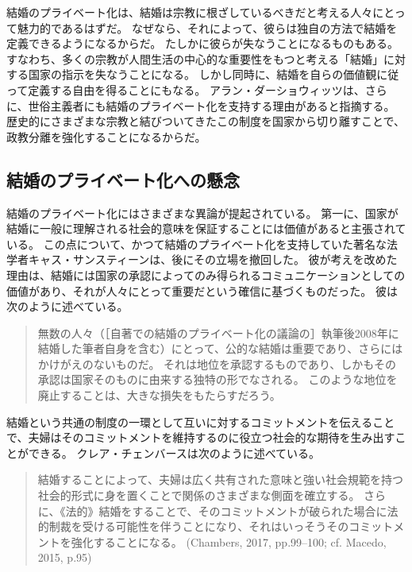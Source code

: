 \documentclass[paper=a4,book,openany]{jlreq}
\newcommand{\ig}[1]{}           %
\begin{document}
結婚のプライベート化は、結婚は宗教に根ざしているべきだと考える人々にとって魅力的であるはずだ。
なぜなら、それによって、彼らは独自の方法で結婚を定義できるようになるからだ。
たしかに彼らが失なうことになるものもある。
すなわち、多くの宗教が人間生活の中心的な重要性をもつと考える「結婚」に対する国家の指示を失なうことになる。
しかし同時に、結婚を自らの価値観に従って定義する自由を得ることにもなる。
アラン・ダーショウィッツは、さらに、世俗主義者にも結婚のプライベート化を支持する理由があると指摘する。
歴史的にさまざまな宗教と結びついてきたこの制度を国家から切り離すことで、政教分離を強化することになるからだ\citep{dershowitz03:_to_fix_gay_dilem_gover}。

\subsection{結婚のプライベート化への懸念}

結婚のプライベート化にはさまざまな異論が提起されている。
第一に、国家が結婚に一般に理解される社会的意味を保証することには価値があると主張されている。
この点について、かつて結婚のプライベート化を支持していた著名な法学者キャス・サンスティーンは、後にその立場を撤回した。
彼が考えを改めた理由は、結婚には国家の承認によってのみ得られるコミュニケーションとしての価値があり、それが人々にとって重要だという確信に基づくものだった。
彼は次のように述べている。

\begin{quote}
無数の人々（［自著での結婚のプライベート化の議論の］執筆後2008年に結婚した筆者自身を含む）にとって、公的な結婚は重要であり、さらにはかけがえのないものだ。
それは地位を承認するものであり、しかもその承認は国家そのものに由来する独特の形でなされる。
このような地位を廃止することは、大きな損失をもたらすだろう。
\citep[p.296]{sunstein17:_statem_i_most_regret}
\end{quote}

結婚という共通の制度の一環として互いに対するコミットメントを伝えることで、夫婦はそのコミットメントを維持するのに役立つ社会的な期待を生み出すことができる。
クレア・チェンバースは次のように述べている。

\begin{quote}
結婚することによって、夫婦は広く共有された意味と強い社会規範を持つ社会的形式に身を置くことで関係のさまざまな側面を確立する。
さらに、《法的》結婚をすることで、そのコミットメントが破られた場合に法的制裁を受ける可能性を伴うことになり、それはいっそうそのコミットメントを強化することになる。
(Chambers, 2017, pp.99--100; cf. Macedo, 2015, p.95) \nocite{chambers17:againstmarriage} \nocite{macedo15:_just_married}\ig{Clare chmbers}
\end{quote}
\end{document}
